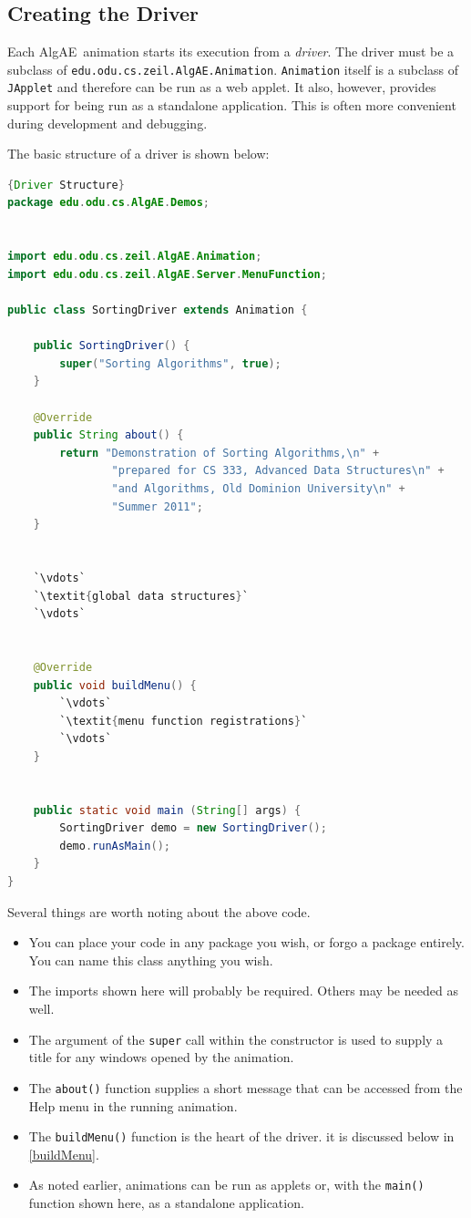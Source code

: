 \documentclass[11pt,titlepage]{book}
\newcommand{\algae}{{\sc AlgAE}}
\begin{document}
\subsection{Creating the Driver}

Each \algae\ animation starts its execution from a {\em driver}. The
driver must be a subclass of
\texttt{edu.odu.cs.zeil.AlgAE.Animation}. {\tt Animation} itself is a
subclass of {\tt JApplet} and therefore can be run as a web applet. It
also, however, provides support for being run as a standalone
application. This is often more convenient during development and debugging.

The basic structure of a driver is shown below:
\begin{lstlisting}[frame=tb,language=Java]{Driver Structure}
package edu.odu.cs.AlgAE.Demos;


import edu.odu.cs.zeil.AlgAE.Animation;
import edu.odu.cs.zeil.AlgAE.Server.MenuFunction;

public class SortingDriver extends Animation {

    public SortingDriver() {
        super("Sorting Algorithms", true);
    }

    @Override
    public String about() {
        return "Demonstration of Sorting Algorithms,\n" +
                "prepared for CS 333, Advanced Data Structures\n" +
                "and Algorithms, Old Dominion University\n" +
                "Summer 2011";
    }

    
    `\vdots`
    `\textit{global data structures}`
    `\vdots`
    
    
    @Override
    public void buildMenu() {
        `\vdots`
        `\textit{menu function registrations}`
        `\vdots`
    }
    
    
    public static void main (String[] args) {
        SortingDriver demo = new SortingDriver();
        demo.runAsMain();
    }
}
\end{lstlisting}
Several things are worth noting about the above code.
\begin{itemize}
\item You can place your code in any package you wish, or forgo a
package entirely.  You can name this class anything you wish.

\item The imports shown here will probably be required. Others may be
needed as well.

\item The argument of the \texttt{super} call within the constructor
  is used to supply a title for any windows opened by the animation.

\item The \texttt{about()} function supplies a short message that
  can be accessed from the Help menu in the running animation.

\item The \texttt{buildMenu()} function is the heart of the driver.
   it is discussed below in \autoref{buildMenu}.

\item As noted earlier, animations can be run as applets or, with the
  \texttt{main()} function shown here, as a standalone application.
\end{itemize}
\end{document}
